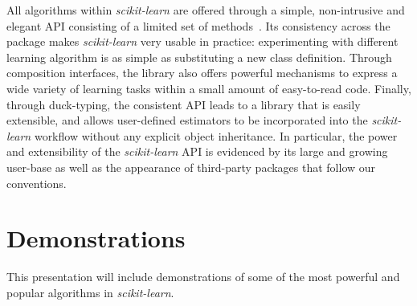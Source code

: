 \documentclass{article}
\newcommand{\sklearn}{\textit{scikit-learn}\xspace}
\DeclareRobustCommand{\VAN}[3]{#2}
\begin{document}
All algorithms within \sklearn are offered through a simple, non-intrusive and
elegant API consisting of a limited set of methods~\citep{buitinck2013api}. Its
consistency across the package makes \sklearn very usable in practice:
experimenting with different learning algorithm is as simple as substituting a
new class definition. Through composition interfaces, the library also offers
powerful mechanisms to express a wide variety of learning tasks within a small
amount of easy-to-read code. Finally, through duck-typing, the consistent API
leads to a library that is easily extensible, and allows user-defined
estimators to be incorporated into the \sklearn workflow without any explicit
object inheritance. In particular, the power and extensibility of the \sklearn
API is evidenced by its large and growing user-base as well as the appearance
of third-party packages that follow our conventions.


\section*{Demonstrations}

This presentation will include demonstrations of some of the most powerful and
popular algorithms in \sklearn.



\DeclareRobustCommand{\VAN}[3]{#3}

\end{document}

